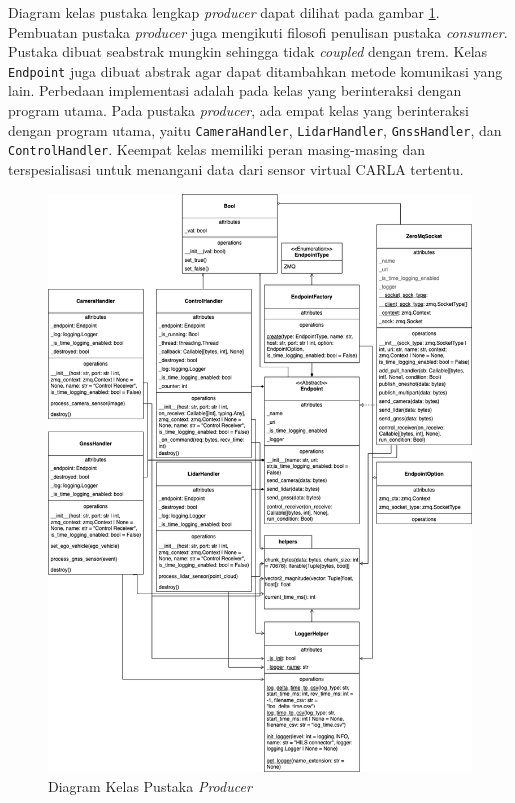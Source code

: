 Diagram kelas pustaka lengkap \textit{producer} dapat dilihat pada gambar
\ref{chapter-4-producer-class-diagram}. Pembuatan pustaka \textit{producer} juga
mengikuti filosofi penulisan pustaka \textit{consumer}. Pustaka dibuat seabstrak
mungkin sehingga tidak \textit{coupled} dengan trem. Kelas \texttt{Endpoint}
juga dibuat abstrak agar dapat ditambahkan metode komunikasi yang lain.
Perbedaan implementasi adalah pada kelas yang berinteraksi dengan program utama.
Pada pustaka \textit{producer}, ada empat kelas yang berinteraksi dengan program
utama, yaitu \texttt{CameraHandler}, \texttt{LidarHandler},
\texttt{GnssHandler}, dan \texttt{ControlHandler}. Keempat kelas memiliki peran
masing-masing dan terspesialisasi untuk menangani data dari sensor virtual CARLA
tertentu.
\begin{figure}[!htbp]
	\centering
	\includegraphics[width=1.0\textwidth]{resources/chapter-4/producer-class_diagram.png}
	\caption{Diagram Kelas Pustaka \textit{Producer}}
	\label{chapter-4-producer-class-diagram}
\end{figure}

